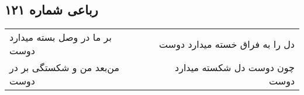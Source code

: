\begin{center}
\section*{رباعی شماره ۱۲۱}
\label{sec:sh121}
\begin{longtable}{l p{0.5cm} r}
بر ما در وصل بسته میدارد دوست
&&
دل را به فراق خسته میدارد دوست
\\
من‌بعد من و شکستگی بر در دوست
&&
چون دوست دل شکسته میدارد دوست
\\
\end{longtable}
\end{center}
